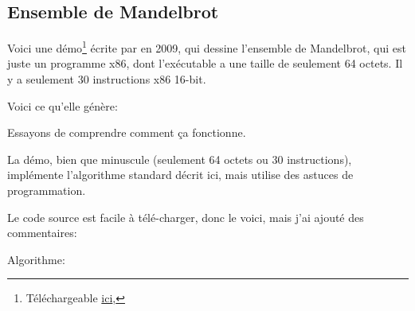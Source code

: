 \clearpage
\subsection{Ensemble de Mandelbrot}
\label{Mandelbrot_demo}


Voici une démo\footnote{Téléchargeable \href{http://www.pouet.net/prod.php?which=53287} {ici},}
écrite par  en 2009, qui dessine l'ensemble de Mandelbrot, qui est
juste un programme x86, dont l'exécutable a une taille de seulement 64 octets.
Il y a seulement 30 instructions x86 16-bit.

Voici ce qu'elle génère:

\begin{figure}[H]
\centering
{}
\end{figure}

Essayons de comprendre comment ça fonctionne.

La démo, bien que minuscule (seulement 64 octets ou 30 instructions), implémente
l'algorithme standard décrit ici, mais utilise des astuces de programmation.

Le code source est facile à télé-charger, donc le voici, mais j'ai ajouté des commentaires:



Algorithme:

